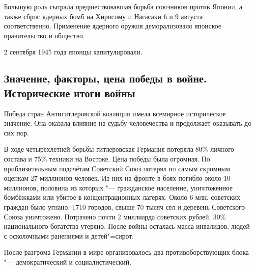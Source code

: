 Большую роль сыграла предшествовавшая борьба союзников против Японии, а также сброс ядерных бомб на Хиросиму и Нагасаки 6 и 9 августа соответственно. Применение ядерного оружия деморализовало японское правительство и общество.

2 сентября 1945 года японцы капитулировали.

\subsection{Значение, факторы, цена победы в войне. Исторические итоги войны}

Победа стран Антигитлеровской коалиции имела всемирное историческое значение. Она оказала влияние на судьбу человечества и продолжает оказывать до сих пор.

В ходе четырёхлетней борьбы гитлеровская Германия потеряла 80\% личного состава и 75\% техники на Востоке. Цена победы была огромная. По приблизительным подсчётам Советский Союз потерял по самым скромным оценкам 27 миллионов человек. Из них на фронте в боях погибло около 10 миллионов, половина из которых "--- гражданское население, уничтоженное бомбёжками или убитое в концентрационных лагерях. Около 6 млн. советских граждан было угнано. 1710 городов, свыше 70 тысяч сёл и деревень Советского Союза уничтожено. Потрачено почти 2 миллиарда советских рублей, 30\% национального богатства утеряно. После войны осталась масса инвалидов, людей с осколочными ранениями и детей"=сирот.

После разгрома Германии в мире организовалось два противоборствующих блока "--- демократический и социалистический.
